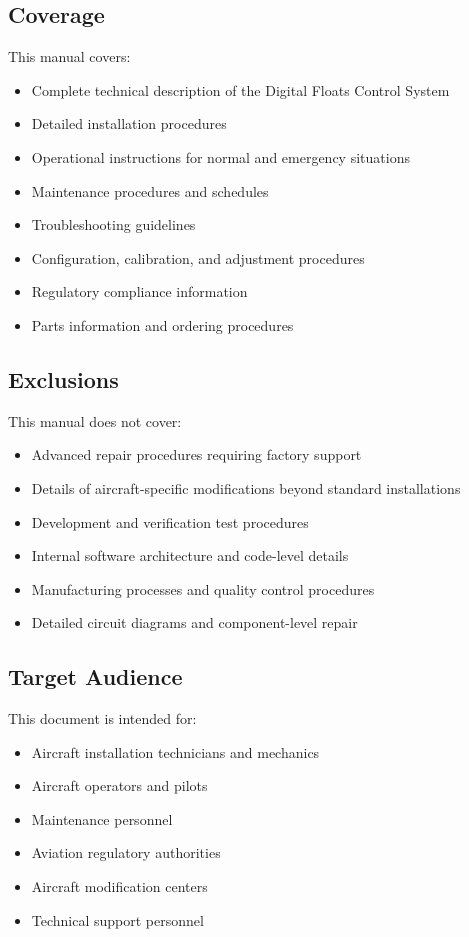\documentclass[12pt,a4paper,twoside,openright]{book}
\begin{document}
\subsection{Coverage}

This manual covers:

\begin{itemize}
    \item Complete technical description of the Digital Floats Control System
    \item Detailed installation procedures
    \item Operational instructions for normal and emergency situations
    \item Maintenance procedures and schedules
    \item Troubleshooting guidelines
    \item Configuration, calibration, and adjustment procedures
    \item Regulatory compliance information
    \item Parts information and ordering procedures
\end{itemize}

\subsection{Exclusions}

This manual does not cover:

\begin{itemize}
    \item Advanced repair procedures requiring factory support
    \item Details of aircraft-specific modifications beyond standard installations
    \item Development and verification test procedures
    \item Internal software architecture and code-level details
    \item Manufacturing processes and quality control procedures
    \item Detailed circuit diagrams and component-level repair
\end{itemize}

\subsection{Target Audience}

This document is intended for:

\begin{itemize}
    \item Aircraft installation technicians and mechanics
    \item Aircraft operators and pilots
    \item Maintenance personnel
    \item Aviation regulatory authorities
    \item Aircraft modification centers
    \item Technical support personnel
\end{itemize}
\end{document}

